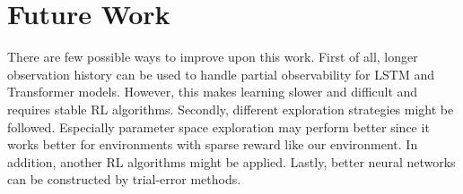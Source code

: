\section{Future Work}
\label{sec:future_work}

There are few possible ways to improve upon this work. First of all, longer observation history can be used to handle partial observability for LSTM and Transformer models. However, this makes learning slower and difficult and requires stable RL algorithms. Secondly, different exploration strategies might be followed. Especially parameter space exploration \cite{plappert_parameter_2018} may perform better since it works better for environments with sparse reward like our environment. 
In addition, another RL algorithms might be applied. 
Lastly, better neural networks can be constructed by trial-error methods. 